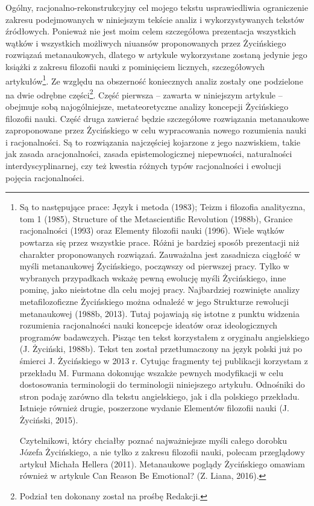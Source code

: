 \documentclass{article}
\begin{document}
Ogólny, racjonalno-rekonstrukcyjny cel mojego tekstu usprawiedliwia ograniczenie zakresu podejmowanych w niniejszym
tekście analiz i wykorzystywanych tekstów źródłowych. Ponieważ nie jest moim celem szczegółowa prezentacja wszystkich
wątków i wszystkich możliwych niuansów proponowanych przez Życińskiego rozwiązań metanaukowych, dlatego w artykule
wykorzystane zostaną jedynie jego książki z zakresu filozofii nauki z pominięciem licznych, szczegółowych
artykułów\footnote{Są to następujące prace: Język i metoda \label{ref:RND1LhiGh0y5p}(1983); Teizm i filozofia
analityczna, tom 1 \label{ref:RND68nQZEVcjZ}(1985), Structure of the Metascientific Revolution
\label{ref:RNDgXcIEkiEEw}(1988b), Granice racjonalności \label{ref:RND9m82QoDque}(1993) oraz Elementy filozofii nauki
\label{ref:RNDBnf6pOKYn0}(1996). Wiele wątków powtarza się przez wszystkie prace. Różni je bardziej sposób prezentacji
niż charakter proponowanych rozwiązań. Zauważalna jest zasadnicza ciągłość w myśli metanaukowej Życińskiego, począwszy
od pierwszej pracy. Tylko w wybranych przypadkach wskażę pewną ewolucję myśli Życińskiego, inne pominę, jako nieistotne
dla celu mojej pracy. Najbardziej rozwinięte analizy metafilozoficzne Życińskiego można odnaleźć w jego Strukturze
rewolucji metanaukowej \label{ref:RNDPOjzmhEMek}(1988b, 2013). Tutaj pojawiają się istotne z punktu widzenia rozumienia
racjonalności nauki koncepcje ideatów oraz ideologicznych programów badawczych. Pisząc ten tekst korzystałem z
oryginału angielskiego \label{ref:RNDFZPJ2Z2OCH}(J. Życiński, 1988b). Tekst ten został przetłumaczony na język polski
już po śmierci J. Życińskiego w 2013 r. Cytując fragmenty tej publikacji korzystam z przekładu M. Furmana dokonując
wszakże pewnych modyfikacji w celu dostosowania terminologii do terminologii niniejszego artykułu. Odnośniki do stron
podaję zarówno dla tekstu angielskiego, jak i dla polskiego przekładu. Istnieje również drugie, poszerzone wydanie
Elementów filozofii nauki \label{ref:RNDL62LQXHrez}(J. Życiński, 2015). \par Czytelnikowi, który chciałby poznać
najważniejsze myśli całego dorobku Józefa Życińskiego, a nie tylko z zakresu filozofii nauki, polecam przeglądowy
artykuł Michała Hellera \label{ref:RNDeScsQTkW9D}(2011). Metanaukowe poglądy Życińskiego omawiam również w artykule Can
Reason Be Emotional? \label{ref:RNDsr0gJlWoso}(Z. Liana, 2016).}. Ze względu na obszerność koniecznych analiz zostały
one podzielone na dwie odrębne części\footnote{Podział ten dokonany został na prośbę Redakcji.}. Część pierwsza –
zawarta w niniejszym artykule – obejmuje sobą najogólniejsze, metateoretyczne analizy koncepcji Życińskiego filozofii
nauki. Część druga zawierać będzie szczegółowe rozwiązania metanaukowe zaproponowane przez Życińskiego w celu
wypracowania nowego rozumienia nauki i racjonalności. Są to rozwiązania najczęściej kojarzone z jego nazwiskiem, takie
jak zasada aracjonalności, zasada epistemologicznej niepewności, naturalności interdyscyplinarnej, czy też kwestia
różnych typów racjonalności i ewolucji pojęcia racjonalności.
\end{document}
